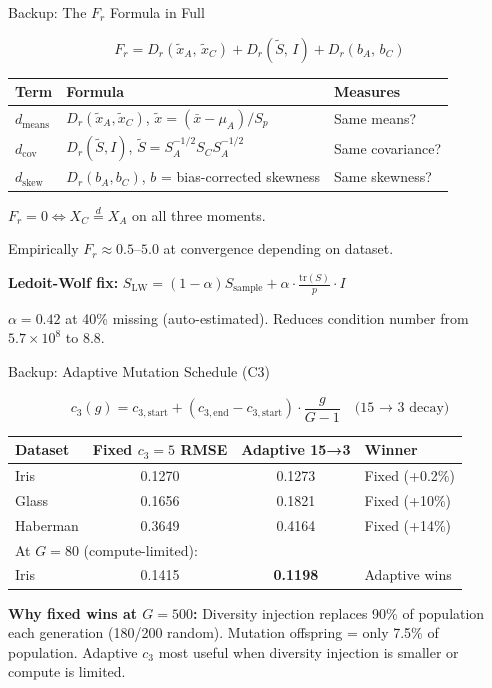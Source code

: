 \documentclass[aspectratio=169,12pt]{beamer}
\begin{document}
\begin{frame}{Backup: The $F_r$ Formula in Full}

\[
F_r = D_r(\tilde{x}_A,\, \tilde{x}_C)
    + D_r(\tilde{S},\, I)
    + D_r(b_A,\, b_C)
\]

\begin{tabular}{lll}
\toprule
Term & Formula & Measures \\
\midrule
$d_{\text{means}}$ & $D_r(\tilde{x}_A, \tilde{x}_C)$, $\tilde{x} = (\bar{x} - \mu_A)/S_p$ & Same means? \\
$d_{\text{cov}}$   & $D_r(\tilde{S}, I)$, $\tilde{S} = S_A^{-1/2} S_C S_A^{-1/2}$ & Same covariance? \\
$d_{\text{skew}}$  & $D_r(b_A, b_C)$, $b$ = bias-corrected skewness & Same skewness? \\
\bottomrule
\end{tabular}

\bigskip
$F_r = 0 \iff X_C \overset{d}{=} X_A$ on all three moments.

Empirically $F_r \approx 0.5$--$5.0$ at convergence depending on dataset.

\bigskip
\textbf{Ledoit-Wolf fix:}
$S_{\text{LW}} = (1-\alpha) S_{\text{sample}} + \alpha \cdot \frac{\text{tr}(S)}{p} \cdot I$

$\alpha = 0.42$ at 40\% missing (auto-estimated). Reduces condition number from $5.7 \times 10^8$ to $8.8$.

\end{frame}


\begin{frame}{Backup: Adaptive Mutation Schedule (C3)}

\[
c_3(g) = c_{3,\text{start}} + (c_{3,\text{end}} - c_{3,\text{start}}) \cdot \frac{g}{G-1}
\quad \text{(15 → 3 decay)}
\]

\renewcommand{\arraystretch}{1.2}
\begin{tabular}{lccl}
\toprule
Dataset & Fixed $c_3=5$ RMSE & Adaptive 15→3 & Winner \\
\midrule
Iris     & 0.1270 & 0.1273 & Fixed (+0.2\%) \\
Glass    & 0.1656 & 0.1821 & Fixed (+10\%) \\
Haberman & 0.3649 & 0.4164 & Fixed (+14\%) \\
\midrule
\multicolumn{4}{l}{At $G=80$ (compute-limited):} \\
Iris     & 0.1415 & \textbf{0.1198} & Adaptive wins \\
\bottomrule
\end{tabular}

\bigskip
\textbf{Why fixed wins at $G=500$:} Diversity injection replaces 90\% of population each generation (180/200 random). Mutation offspring = only 7.5\% of population. Adaptive $c_3$ most useful when diversity injection is smaller or compute is limited.

\end{frame}
\end{document}
